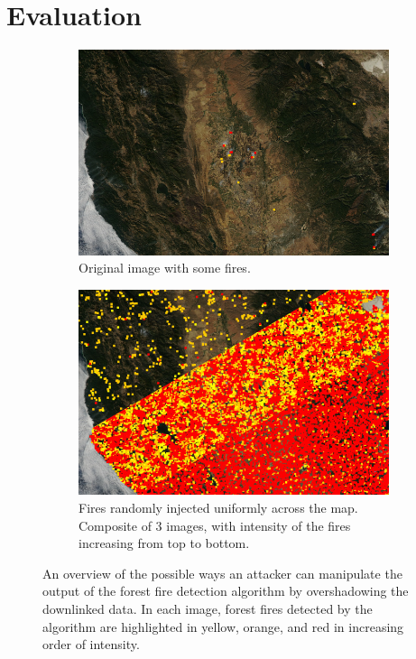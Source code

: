 \section{Evaluation}\label{sec:evaluation}

\begin{figure}
    \centering
    \begin{subfigure}{0.49\textwidth}
        \centering
        \includegraphics[width=\textwidth]{diagrams/injection/original.jpg}
        \caption{Original image with some fires.\newline}
        \label{fig:injection-orig}
    \end{subfigure}
    \begin{subfigure}{0.49\textwidth}
        \centering
        \includegraphics[width=\textwidth]{diagrams/injection/random_combined_diagonal.jpg}
        \caption{Fires randomly injected uniformly across the map. Composite of 3 images, with intensity of the fires increasing from top to bottom.}
        \label{fig:injection-random}
    \end{subfigure}
    \caption{An overview of the possible ways an attacker can manipulate the output of the forest fire detection algorithm by overshadowing the downlinked data. In each image, forest fires detected by the algorithm are highlighted in yellow, orange, and red in increasing order of intensity.}
    \label{fig:injection}
\end{figure}

